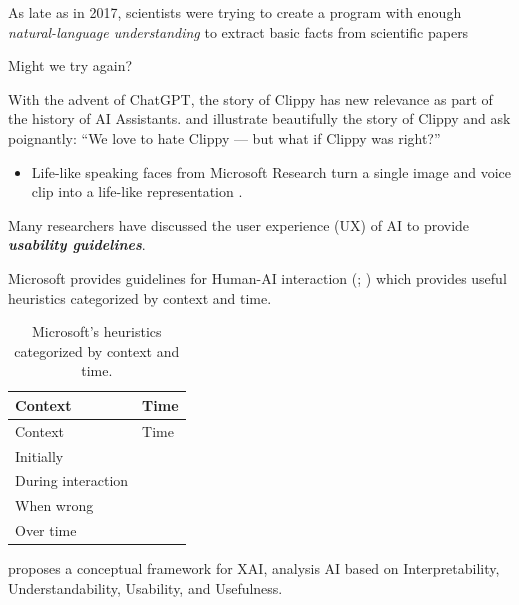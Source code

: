 \documentclass[
  letterpaper,
  DIV=11,
  numbers=noendperiod]{scrartcl}
\providecommand{\tightlist}{%
  \setlength{\itemsep}{0pt}\setlength{\parskip}{0pt}}\usepackage{longtable,booktabs,array}
\begin{document}
As late as in 2017, scientists were trying to create a program with
enough \emph{natural-language understanding} to extract basic facts from
scientific papers \citet{stocktonIfAICan2017}

Might we try again?

With the advent of ChatGPT, the story of Clippy has new relevance as
part of the history of AI Assistants.
\citet{benjamincassidyTwistedLifeClippy2022} and
\citet{abigailcainLifeDeathMicrosoft2017} illustrate beautifully the
story of Clippy and \citet{tashkeunemanWeLoveHate2022} ask poignantly:
``We love to hate Clippy --- but what if Clippy was right?''

\begin{itemize}
\tightlist
\item
  Life-like speaking faces from Microsoft Research turn a single image
  and voice clip into a life-like representation
  \citep{xuVASA1LifelikeAudioDriven2024}.
\end{itemize}

Many researchers have discussed the user experience (UX) of AI to
provide \textbf{\emph{usability guidelines}}.

Microsoft provides guidelines for Human-AI interaction
(\citet{li2022assessing};
\citet{amershiGuidelinesHumanAIInteraction2019}) which provides useful
heuristics categorized by context and time.

\begin{longtable}[]{@{}ll@{}}
\caption{Microsoft's heuristics categorized by context and
time.}\tabularnewline
\toprule\noalign{}
Context & Time \\
\midrule\noalign{}
\endfirsthead
\toprule\noalign{}
Context & Time \\
\midrule\noalign{}
\endhead
\bottomrule\noalign{}
\endlastfoot
Initially & \\
During interaction & \\
When wrong & \\
Over time & \\
\end{longtable}

\citet{combiManifestoExplainabilityArtificial2022} proposes a conceptual
framework for XAI, analysis AI based on Interpretability,
Understandability, Usability, and Usefulness.
\end{document}
